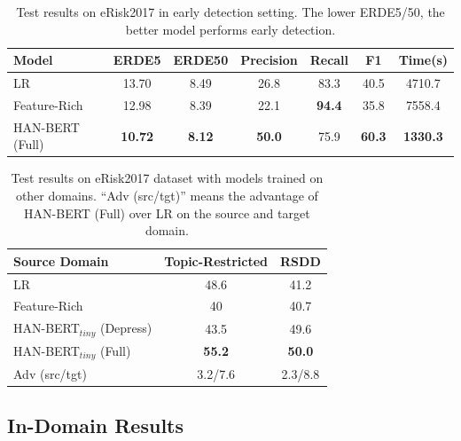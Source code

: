 \begin{table}[th]
    \centering
	\small
    \begin{tabular}{l|cccccc}
        \hline
        Model & ERDE5 & ERDE50 & Precision & Recall & F1 & Time(s) \\
        \hline
        LR & 13.70 & 8.49 & 26.8 & 83.3 & 40.5 & 4710.7 \\
        Feature-Rich & 12.98 & 8.39 & 22.1 & \textbf{94.4} & 35.8 & 7558.4 \\
        HAN-BERT (Full) & \textbf{10.72} & \textbf{8.12} & \textbf{50.0} & 75.9 & \textbf{60.3} & \textbf{1330.3} \\
        \hline
    \end{tabular}
    \caption{\label{table:early} Test results on eRisk2017 in early detection setting. The lower ERDE5/50, the better model performs early detection.}
\end{table}

\begin{table}[th]
    \centering
	\small
    \begin{tabular}{l|cc}
        \hline
        Source Domain & Topic-Restricted & RSDD \\
        \hline
        LR & 48.6 & 41.2 \\
        Feature-Rich & 40 & 40.7 \\
        \hline
        HAN-BERT$_{tiny}$ (Depress) & 43.5 & 49.6 \\
        HAN-BERT$_{tiny}$ (Full) & \textbf{55.2} & \textbf{50.0} \\
        \hline
        Adv (src/tgt) & 3.2/7.6 & 2.3/8.8 \\
        \hline
    \end{tabular}
    \caption{\label{table:cross} Test results on eRisk2017 dataset with models trained on other domains. ``Adv (src/tgt)'' means the advantage of HAN-BERT (Full) over LR on the source and target domain.}
\end{table}

\subsection{In-Domain Results}
\label{sec:in-domain}

